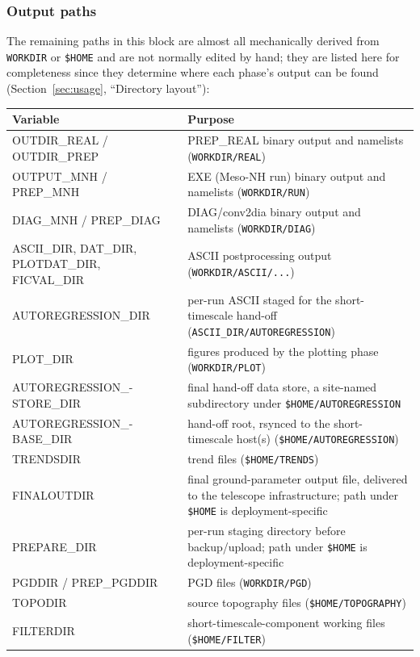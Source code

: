 \subsubsection{Output paths}
The remaining paths in this block are almost all mechanically derived from \texttt{WORKDIR} or
\texttt{\$HOME} and are not normally edited by hand; they are listed here for completeness since they
determine where each phase's output can be found (Section~\ref{sec:usage}, ``Directory layout''):
\begin{table}[H]
\centering
\begin{tabular}{|p{4.8cm}|p{10cm}|}
\hline
\textbf{Variable} & \textbf{Purpose} \\ \hline
OUTDIR\_REAL / OUTDIR\_PREP & PREP\_REAL binary output and namelists (\texttt{WORKDIR/REAL}) \\ \hline
OUTPUT\_MNH / PREP\_MNH & EXE (Meso-NH run) binary output and namelists (\texttt{WORKDIR/RUN}) \\ \hline
DIAG\_MNH / PREP\_DIAG & DIAG/conv2dia binary output and namelists (\texttt{WORKDIR/DIAG}) \\ \hline
ASCII\_DIR, DAT\_DIR, PLOTDAT\_DIR, FICVAL\_DIR & ASCII postprocessing output (\texttt{WORKDIR/ASCII/...}) \\ \hline
AUTOREGRESSION\_DIR & per-run ASCII staged for the short-timescale hand-off (\texttt{ASCII\_DIR/AUTOREGRESSION}) \\ \hline
PLOT\_DIR & figures produced by the plotting phase (\texttt{WORKDIR/PLOT}) \\ \hline
AUTOREGRESSION\_-\newline STORE\_DIR & final hand-off data store, a site-named
 subdirectory under \texttt{\$HOME/AUTOREGRESSION} \\ \hline
AUTOREGRESSION\_-\newline BASE\_DIR & hand-off root, rsynced to the short-timescale host(s) (\texttt{\$HOME/AUTOREGRESSION}) \\ \hline
TRENDSDIR & trend files (\texttt{\$HOME/TRENDS}) \\ \hline
FINALOUTDIR & final ground-parameter output file, delivered to the telescope infrastructure;
 path under \texttt{\$HOME} is deployment-specific \\ \hline
PREPARE\_DIR & per-run staging directory before backup/upload; path under \texttt{\$HOME}
 is deployment-specific \\ \hline
PGDDIR / PREP\_PGDDIR & PGD files (\texttt{WORKDIR/PGD}) \\ \hline
TOPODIR & source topography files (\texttt{\$HOME/TOPOGRAPHY}) \\ \hline
FILTERDIR & short-timescale-component working files (\texttt{\$HOME/FILTER}) \\ \hline
\end{tabular}
\end{table}
